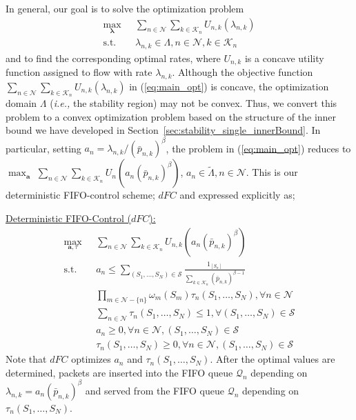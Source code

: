 \documentclass[conference]{IEEEtran}
\newcommand{\ie}{{\em i.e., }}
\newcommand{\Sset}{\mathcal{S}}
\newcommand{\Kset}{\mathcal{K}}
\newcommand{\Nset}{\mathcal{N}}
\newcommand{\Qset}{\mathcal{Q}}
\begin{document}
In general, our goal is to solve the optimization problem
\begin{align}\label{eq:main_opt}
\max_{\boldsymbol \lambda} \mbox{ } &  \sum_{n \in \Nset} \sum_{k \in \Kset_{n}} U_{n,k}(\lambda_{n,k}) \nonumber \\
\mbox{s.t.} \mbox{ }  & \lambda_{n,k} \in \Lambda, n \in \Nset, k \in \Kset_{n}
\end{align} and to find the corresponding optimal rates,  where $U_{n,k}$ is a concave utility function assigned to flow with rate $\lambda_{n,k}$. 
Although the objective function $\sum_{n \in \Nset} \sum_{k \in \Kset_{n}} U_{n,k}(\lambda_{n,k})$ in (\ref{eq:main_opt}) is concave, the optimization domain $\Lambda$ (\ie the stability region) may not be convex. Thus, we convert this problem to a convex optimization problem based on the structure of the inner bound we have developed in Section~\ref{sec:stability_single_innerBound}. 
In particular, setting $a_n = \lambda_{n,k}/(\bar{p}_{n,k})^{\beta}$, the problem in (\ref{eq:main_opt}) reduces to  $\max_{\boldsymbol a}$   $\sum_{n \in \Nset} \sum_{k \in \Kset_{n}} U_n(a_n(\bar{p}_{n,k})^{\beta})$, $a_{n} \in \tilde{\Lambda}, n \in \Nset$. This is our deterministic FIFO-control scheme; $dFC$ and expressed explicitly as;

\underline{Deterministic FIFO-Control ($dFC$):}
\begin{align} \label{eq:dFC}
\max_{\boldsymbol a, \tau} \mbox{ } &  \sum_{n \in \Nset} \sum_{k \in \Kset_{n}} U_{n,k}(a_n(\bar{p}_{n,k})^{\beta}) \nonumber \\
\mbox{s.t.} \mbox{ }  &  a_n \leq \sum_{(S_1, \ldots, S_N) \in \Sset} \frac{1_{[S_n]}}{\sum_{k \in \Kset_{n}} (\bar{p}_{n,k})^{\beta-1}} \nonumber \\
& \prod_{m \in \Nset - \{n\}} \omega_{m}(S_m)  \tau_{n}(S_1, \ldots, S_N), \forall n \in \Nset \nonumber \\
& \sum_{n \in \Nset} \tau_{n} (S_1, \ldots, S_N) \leq 1, \forall (S_1, \ldots, S_N) \in \Sset \nonumber \\
& a_n \geq 0, \forall n \in \Nset, (S_1, \ldots, S_N) \in \Sset \nonumber \\
& \tau_{n} (S_1, \ldots, S_N) \geq 0, \forall n \in \Nset, (S_1, \ldots, S_N) \in \Sset
\end{align} Note that $dFC$ optimizes $a_n$ and $\tau_{n}{(S_1, \ldots, S_N)}$. After the optimal values are determined, 
packets are inserted into the FIFO queue $\Qset_{n}$ depending on $\lambda_{n,k} = a_n(\bar{p}_{n,k})^{\beta}$ and served from the FIFO queue $\Qset_{n}$ depending on $\tau_{n}{(S_1, \ldots, S_N)}$. 
\end{document}

